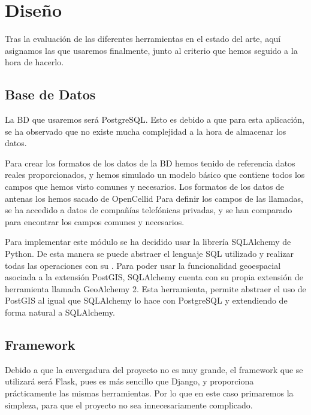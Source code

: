   
\section{Diseño\label{SEC:DISENO}}
  Tras la evaluación de las diferentes herramientas en el estado del arte, aquí asignamos las que usaremos finalmente, junto al criterio que hemos seguido a la hora de hacerlo.
  
  \subsection{Base de Datos}
    La BD que usaremos será PostgreSQL. Esto es debido a que para esta aplicación, se ha observado que no existe mucha complejidad a la hora de almacenar los datos.
    
    Para crear los formatos de los datos de la BD hemos tenido de referencia datos reales proporcionados, y hemos simulado un modelo básico que contiene todos los campos que hemos visto comunes y necesarios.
    Los formatos de los datos de antenas los hemos sacado de OpenCellid \cite{opencellid}
    Para definir los campos de las llamadas, se ha accedido a datos de compañías telefónicas privadas, y se han comparado para encontrar los campos comunes y necesarios.
    
    Para implementar este módulo se ha decidido usar la librería SQLAlchemy\cite{sqlalchemy} de Python. De esta manera se puede abstraer el lenguaje SQL utilizado y realizar todas las operaciones con su . 
    Para poder usar la funcionalidad geoespacial asociada a la extensión PostGIS, SQLAlchemy cuenta con su propia extensión de herramienta llamada GeoAlchemy 2\cite{geoalchemy}. Esta herramienta, permite abstraer el uso de PostGIS al igual que SQLAlchemy lo hace con PostgreSQL y extendiendo de forma natural a SQLAlchemy.
    
    
  \subsection{Framework}
    Debido a que la envergadura del proyecto no es muy grande, el framework que se utilizará será Flask, pues es más sencillo que Django, y proporciona prácticamente las mismas herramientas. Por lo que en este caso primaremos la simpleza, para que el proyecto no sea innecesariamente complicado.

